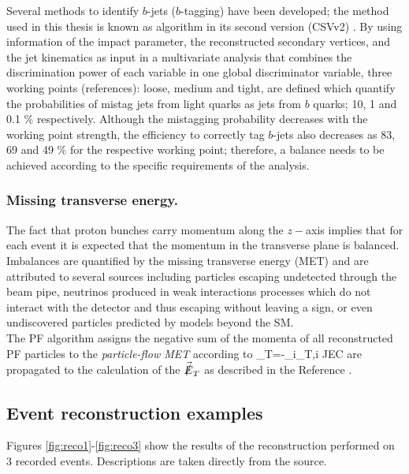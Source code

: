 \noindent Several methods to identify $b$-jets ($b$-tagging) have been developed; the method used in this thesis is known as  algorithm in its second version (CSVv2) \cite{btag}. By using information of the impact parameter, the reconstructed secondary vertices, and the jet kinematics as input in a multivariate analysis that combines the discrimination power of each variable in one global discriminator variable, three working points (references): loose, medium and tight, are defined which quantify the probabilities of mistag jets from light quarks as jets from $b$ quarks; 10, 1 and 0.1 \% respectively. Although the mistagging probability decreases with the working point strength, the efficiency to correctly tag $b$-jets also decreases as 83, 69 and 49 \% for the respective working point; therefore, a balance needs to be achieved according to the specific requirements of the analysis.

\subsubsection{Missing transverse energy.}\label{sssec:met}

\noindent The fact that proton bunches carry momentum along the $z-$axis implies that for each event it is expected that the momentum in the transverse plane is balanced. Imbalances are quantified by the missing transverse energy (MET) and are attributed to several sources including particles escaping undetected through the beam pipe, neutrinos produced in weak interactions processes which do not interact with the detector and thus escaping without leaving a sign, or even undiscovered particles predicted by models beyond the SM.\\

\noindent The PF algorithm assigns the negative sum of the momenta of all reconstructed PF particles to the \textit{particle-flow MET} according to
\beqn
{}_T=-\sum_{i}_{T,i}
\eeqn
\noindent JEC are propagated to the calculation of the $\vec{\slashed{E}}_T$ as described in the Reference \cite{metcorr}.\\

\subsection{Event reconstruction examples}

\noindent Figures \ref{fig:reco1}-\ref{fig:reco3} show the results of the reconstruction performed on 3 recorded events. Descriptions are taken directly from the source.

